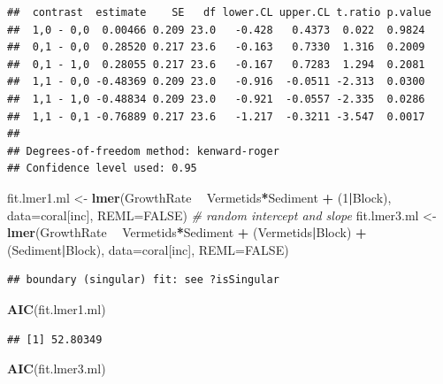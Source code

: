 \documentclass[]{book}
\newenvironment{Shaded}{\begin{snugshade}}{\end{snugshade}}
\newcommand{\KeywordTok}[1]{\textcolor[rgb]{0.13,0.29,0.53}{\textbf{#1}}}
\newcommand{\DataTypeTok}[1]{\textcolor[rgb]{0.13,0.29,0.53}{#1}}
\newcommand{\DecValTok}[1]{\textcolor[rgb]{0.00,0.00,0.81}{#1}}
\newcommand{\StringTok}[1]{\textcolor[rgb]{0.31,0.60,0.02}{#1}}
\newcommand{\CommentTok}[1]{\textcolor[rgb]{0.56,0.35,0.01}{\textit{#1}}}
\newcommand{\OtherTok}[1]{\textcolor[rgb]{0.56,0.35,0.01}{#1}}
\newcommand{\OperatorTok}[1]{\textcolor[rgb]{0.81,0.36,0.00}{\textbf{#1}}}
\newcommand{\NormalTok}[1]{#1}
\begin{document}
\begin{verbatim}
##  contrast  estimate    SE   df lower.CL upper.CL t.ratio p.value
##  1,0 - 0,0  0.00466 0.209 23.0   -0.428   0.4373  0.022  0.9824 
##  0,1 - 0,0  0.28520 0.217 23.6   -0.163   0.7330  1.316  0.2009 
##  0,1 - 1,0  0.28055 0.217 23.6   -0.167   0.7283  1.294  0.2081 
##  1,1 - 0,0 -0.48369 0.209 23.0   -0.916  -0.0511 -2.313  0.0300 
##  1,1 - 1,0 -0.48834 0.209 23.0   -0.921  -0.0557 -2.335  0.0286 
##  1,1 - 0,1 -0.76889 0.217 23.6   -1.217  -0.3211 -3.547  0.0017 
## 
## Degrees-of-freedom method: kenward-roger 
## Confidence level used: 0.95
\end{verbatim}

\begin{Shaded}
\begin{Highlighting}[]
\NormalTok{fit.lmer1.ml <-}\StringTok{ }\KeywordTok{lmer}\NormalTok{(GrowthRate }\OperatorTok{~}\StringTok{ }\NormalTok{Vermetids}\OperatorTok{*}\NormalTok{Sediment }\OperatorTok{+}\StringTok{ }\NormalTok{(}\DecValTok{1}\OperatorTok{|}\NormalTok{Block), }\DataTypeTok{data=}\NormalTok{coral[inc], }\DataTypeTok{REML=}\OtherTok{FALSE}\NormalTok{)}
\CommentTok{# random intercept and slope}
\NormalTok{fit.lmer3.ml <-}\StringTok{ }\KeywordTok{lmer}\NormalTok{(GrowthRate }\OperatorTok{~}\StringTok{ }\NormalTok{Vermetids}\OperatorTok{*}\NormalTok{Sediment }\OperatorTok{+}\StringTok{ }\NormalTok{(Vermetids}\OperatorTok{|}\NormalTok{Block) }\OperatorTok{+}\StringTok{ }\NormalTok{(Sediment}\OperatorTok{|}\NormalTok{Block), }\DataTypeTok{data=}\NormalTok{coral[inc], }\DataTypeTok{REML=}\OtherTok{FALSE}\NormalTok{)}
\end{Highlighting}
\end{Shaded}

\begin{verbatim}
## boundary (singular) fit: see ?isSingular
\end{verbatim}

\begin{Shaded}
\begin{Highlighting}[]
\KeywordTok{AIC}\NormalTok{(fit.lmer1.ml)}
\end{Highlighting}
\end{Shaded}

\begin{verbatim}
## [1] 52.80349
\end{verbatim}

\begin{Shaded}
\begin{Highlighting}[]
\KeywordTok{AIC}\NormalTok{(fit.lmer3.ml)}
\end{Highlighting}
\end{Shaded}
\end{document}
